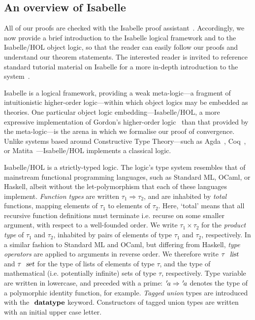 \documentclass[acmlarge,review,anonymous]{acmart}\settopmatter{printfolios=true}
\begin{document}




\subsection{An overview of Isabelle}
\label{subsect.an.overview.of.isabelle}

All of our proofs are checked with the Isabelle proof assistant~\cite{DBLP:conf/tphol/WenzelPN08}.
Accordingly, we now provide a brief introduction to the Isabelle logical framework and to the Isabelle/HOL object logic, so that the reader can easily follow our proofs and understand our theorem statements.
The interested reader is invited to reference standard tutorial material on Isabelle for a more in-depth introduction to the system~\cite{DBLP:books/sp/NipkowK14}.

Isabelle is a logical framework, providing a weak meta-logic---a fragment of intuitionistic higher-order logic---within which object logics may be embedded as theories.
One particular object logic embedding---Isabelle/HOL, a more expressive implementation of Gordon's higher-order logic~\cite{DBLP:conf/tphol/Gordon91} than that provided by the meta-logic---is the arena in which we formalise our proof of convergence.
Unlike systems based around Constructive Type Theory---such as Agda~\cite{DBLP:conf/tphol/BoveDN09}, Coq~\cite{DBLP:conf/popl/HuetH14}, or Matita~\cite{DBLP:conf/cade/AspertiRCT11}---Isabelle/HOL implements a classical logic.

Isabelle/HOL is a strictly-typed logic.
The logic's type system resembles that of mainstream functional programming languages, such as Standard ML, OCaml, or Haskell, albeit without the let-polymorphism that each of these languages implement.
\emph{Function types} are written $\tau_1 \Rightarrow \tau_2$, and are inhabited by \emph{total} functions, mapping elements of $\tau_1$ to elements of $\tau_2$.
Here, `total' means that all recursive function definitions must terminate i.e. recurse on some smaller argument, with respect to a well-founded order.
We write $\tau_1 \times \tau_2$ for the \emph{product type} of $\tau_1$ and $\tau_2$, inhabited by pairs of elements of type $\tau_1$ and $\tau_2$, respectively.
In a similar fashion to Standard ML and OCaml, but differing from Haskell, \emph{type operators} are applied to arguments in reverse order.
We therefore write $\tau\ \isa{list}$ and $\tau\ \isa{set}$ for the type of lists of elements of type $\tau$, and the type of mathematical (i.e. potentially infinite) sets of type $\tau$, respectively.
Type variable are written in lowercase, and preceded with a prime: ${\emph{$\mskip2mu{'}\mskip-2mu$}}a \Rightarrow {\emph{$\mskip2mu{'}\mskip-2mu$}}a$ denotes the type of a polymorphic identity function, for example.
\emph{Tagged union} types are introduced with the $\isacommand{datatype}$ keyword.
Constructors of tagged union types are written with an initial upper case letter.
\end{document}
